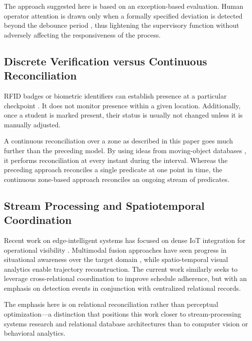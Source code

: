 \documentclass[conference]{IEEEtran}
\begin{document}
The approach suggested here is based on an exception-based evaluation. Human operator attention is drawn only when a formally specified deviation is detected beyond the debounce period \cite{b17}, thus lightening the supervisory function without adversely affecting the responsiveness of the process.

\subsection{Discrete Verification versus Continuous Reconciliation}
RFID badges or biometric identifiers can establish presence at a particular checkpoint \cite{b2, b3}. It does not monitor presence within a given location. Additionally, once a student is marked present, their status is usually not changed unless it is manually adjusted.

A continuous reconciliation over a zone as described in this paper goes much further than the preceding model. By using ideas from moving-object databases \cite{b15, b16}, it performs reconciliation at every instant during the interval. Whereas the preceding approach reconciles a single predicate at one point in time, the continuous zone-based approach reconciles an ongoing stream of predicates.

\subsection{Stream Processing and Spatiotemporal Coordination}
Recent work on edge-intelligent systems has focused on dense IoT integration for operational visibility \cite{b1, b11, b12}. Multimodal fusion approaches have seen progress in situational awareness over the target domain \cite{b6, b10}, while spatio-temporal visual analytics \cite{b8} enable trajectory reconstruction. The current work similarly seeks to leverage cross-relational coordination to improve schedule adherence, but with an emphasis on detection events \cite{b23} in conjunction with centralized relational records.

The emphasis here is on relational reconciliation rather than perceptual optimization---a distinction that positions this work closer to stream-processing systems research \cite{b13, b14, b22, b25, b27} and relational database architectures \cite{b9, b18, b19, b20, b21, b24, b26} than to computer vision or behavioral analytics.

\end{document}
